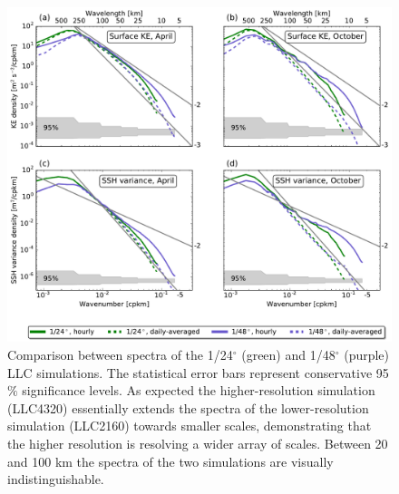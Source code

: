 \documentclass[draft,grl]{agutexSI}
\begin{document}

%


 \begin{figure}
    \begin{center}
      \includegraphics[width=40pc]{figs/fig_s2_3.pdf}
   \caption{Comparison between spectra of the 1/24$^\circ$
   (green) and 1/48$^\circ$ (purple) LLC simulations. The statistical error bars represent conservative
   95$\%$ significance levels.  As expected the
   higher-resolution simulation (LLC4320) essentially extends the spectra of the
   lower-resolution simulation (LLC2160) towards smaller scales, demonstrating that
   the higher resolution is resolving a wider array of scales. Between 20 and 100 km
   the spectra of the two simulations are visually indistinguishable.}
   \label{figS2_3}
   \end{center}
 \end{figure}
\end{document}
